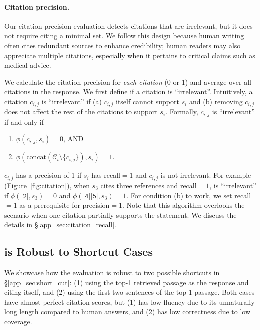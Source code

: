 \paragraph{Citation precision.} 
Our citation precision evaluation detects citations that are irrelevant,
but it does not require citing a minimal set.
We follow this design  because human writing often cites  redundant sources to enhance  credibility;
human readers may also appreciate multiple citations, especially when it pertains to critical claims such as medical advice.


We calculate the citation precision for \textit{each citation} (0 or 1) and
average over all {citations} in the response. %
We first define if a citation is ``irrelevant''.
Intuitively, a citation $c_{i,j}$ is ``irrelevant'' if (a) $c_{i,j}$ itself cannot support $s_i$ and (b) removing $c_{i,j}$ does not affect the rest of the citations to support $s_i$. Formally, $c_{i,j}$ is ``irrelevant'' if and only if
\begin{enumerate}[itemsep=0pt,leftmargin=2em,label=(\alph*)]
        \item  $\phi(c_{i,j},s_i)=0$, AND
        \item  $\phi(\text{concat}(\mathcal{C}_i \setminus \{c_{i,j}\}), s_i)=1$.  
\end{enumerate}
$c_{i,j}$ has a precision  of 1 if $s_i$ has recall$=$$1$ and $c_{i,j}$ is not irrelevant.
For example (Figure~\ref{fig:citation}), when $s_3$ cites three references \ttt{[2][4][5]} and recall$=$$1$,
\ttt{[2]} is ``irrelevant'' if $\phi(\texttt{[2]}, s_3)=0$ and $\phi(\texttt{[4][5]}, s_3)=1$.
For condition (b) to work, we set recall$=$$1$ as a prerequisite for precision$=1$. Note that this algorithm overlooks the scenario when one citation partially supports the statement. 
We discuss the details in \S\ref{app_sec:citation_recall}.









\subsection{\citeeval{} is Robust to Shortcut Cases}
We showcase how the \citeeval{} evaluation is robust to two possible shortcuts in \S\ref{app_sec:short_cut}:
(1) using the top-1 retrieved passage as the response and citing itself, 
and (2) using the first two sentences of the top-1 passage.
Both cases have almost-perfect citation scores, but (1) has low fluency due to its unnaturally long length compared to human answers, and (2) has low correctness due to low coverage.




















 